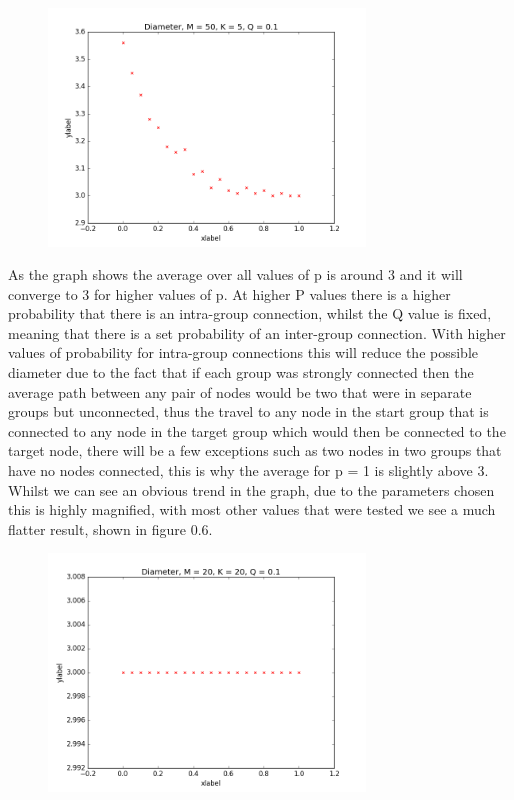 \documentclass[paper=a4, fontsize=11pt]{scrartcl}
\numberwithin{equation}{section}		%
\numberwithin{figure}{section}			%
\numberwithin{table}{section}				%
\begin{document}
\begin{figure}[p]
\center
\caption{}
\includegraphics[width=0.75\textwidth]{pictures/diameter.png}
\end{figure}

As the graph shows the average over all values of p is around 3 and it will converge to 3 for higher values of p. At higher P values there is a higher probability that there is an intra-group connection, whilst the Q value is fixed, meaning that there is a set probability of an inter-group connection. With higher values of probability for intra-group connections this will reduce the possible diameter due to the fact that if each group was strongly connected then the average path between any pair of nodes would be two that were in separate groups but unconnected, thus the travel to any node in the start group that is connected to any node in the target group which would then be connected to the target node, there will be a few exceptions such as two nodes in two groups that have no nodes connected, this is why the average for p = 1 is slightly above 3. Whilst we can see an obvious trend in the graph, due to the parameters chosen this is highly magnified, with most other values that were tested we see a much flatter result, shown in figure 0.6.

\begin{figure}[p]
\center
\caption{}
\includegraphics[width=0.75\textwidth]{pictures/otherD.png}
\end{figure}
\end{document}
